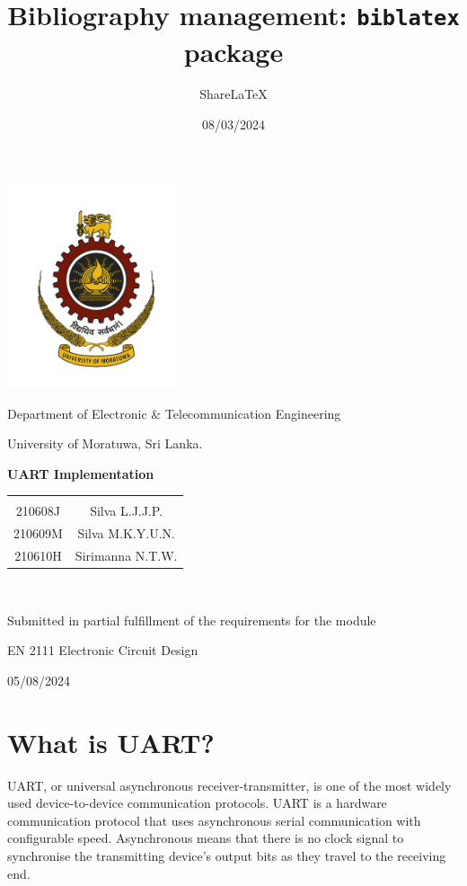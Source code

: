 \documentclass{article}
\title{Bibliography management: \texttt{biblatex} package}
\author{Share\LaTeX}
\date{08/03/2024}
\begin{document}
	
	\begin{titlepage}
		
		\centering
		\vspace*{0.5cm}
		\includegraphics[width=5cm]{logo.png} %
		\par\vspace{0.02cm}
		Department of Electronic \& Telecommunication Engineering
  
            University of Moratuwa, Sri Lanka.
		\par\vspace{4cm}
		{\LARGE\bfseries UART Implementation\par}
		\vspace{5cm}
		\begin{tabular}{c c}
			& \\
            210608J &   Silva L.J.J.P.\\
            210609M	&	Silva M.K.Y.U.N.\\
            210610H &   Sirimanna N.T.W.\\
		\end{tabular}\\
		\vspace{1.3cm}
            {Submitted in partial fulfillment of the requirements for the module\par}
		{EN 2111 Electronic Circuit Design\par}
	
		\vspace{0.5cm}
		{\large 05/08/2024\par}
		\vfill
	\end{titlepage}
	
	\newpage       
            \tableofcontents
            
	\newpage
            \section{What is UART?}
                UART, or universal asynchronous receiver-transmitter, is one of the most widely used device-to-device communication protocols. UART is a hardware communication protocol that uses asynchronous serial communication with configurable speed. Asynchronous means that there is no clock signal to synchronise the transmitting device's output bits as they travel to the receiving end.\\
                    
\end{document}
